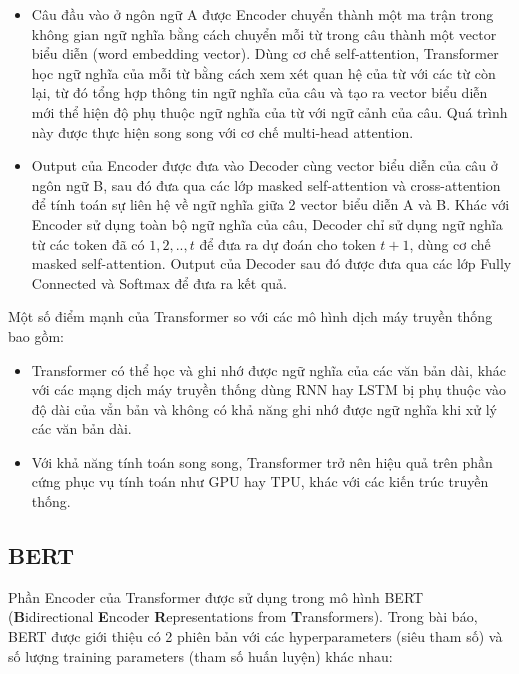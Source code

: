 \begin{itemize}
\item Câu đầu vào ở ngôn ngữ A được Encoder chuyển thành một ma trận trong không gian ngữ nghĩa bằng cách chuyển mỗi từ trong câu thành một vector biểu diễn (word embedding vector). Dùng cơ chế self-attention, Transformer học ngữ nghĩa của mỗi từ bằng cách xem xét quan hệ của từ với các từ còn lại, từ đó tổng hợp thông tin ngữ nghĩa của câu và tạo ra vector biểu diễn mới thể hiện độ phụ thuộc ngữ nghĩa của từ với ngữ cảnh của câu. Quá trình này được thực hiện song song với cơ chế multi-head attention.
\item Output của Encoder được đưa vào Decoder cùng vector biểu diễn của câu ở ngôn ngữ B, sau đó đưa qua các lớp masked self-attention và cross-attention để tính toán sự liên hệ về ngữ nghĩa giữa 2 vector biểu diễn A và B. Khác với Encoder sử dụng toàn bộ ngữ nghĩa của câu, Decoder chỉ sử dụng ngữ nghĩa từ các token đã có $1, 2, .., t$ để đưa ra dự đoán cho token $t + 1$, dùng cơ chế masked self-attention. Output của Decoder sau đó được đưa qua các lớp Fully Connected và Softmax để đưa ra kết quả.
\end{itemize}
Một số điểm mạnh của Transformer so với các mô hình dịch máy truyền thống bao gồm:
\begin{itemize}
\item Transformer có thể học và ghi nhớ được ngữ nghĩa của các văn bản dài, khác với các mạng dịch máy truyền thống dùng RNN hay LSTM bị phụ thuộc vào độ dài của vẳn bản và không có khả năng ghi nhớ được ngữ nghĩa khi xử lý các văn bản dài.
\item Với khả năng tính toán song song, Transformer trở nên hiệu quả trên phần cứng phục vụ tính toán như GPU hay TPU, khác với các kiến trúc truyền thống.
\end{itemize}

\subsection{BERT}
Phần Encoder của Transformer được sử dụng trong mô hình BERT (\textbf{B}idirectional \textbf{E}ncoder \textbf{R}epresentations from \textbf{T}ransformers)\cite{devlin-etal-2019-bert}. Trong bài báo, BERT được giới thiệu có 2 phiên bản với các hyperparameters (siêu tham số) và số lượng training parameters (tham số huấn luyện) khác nhau:

